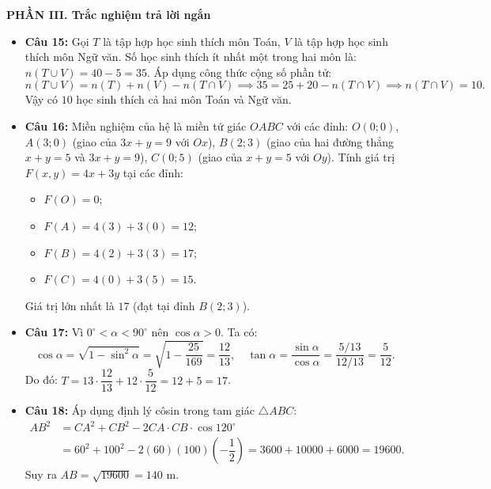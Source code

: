 \documentclass[12pt,a4paper]{article}
\begin{document}
\vspace{0.2cm}
\textbf{PHẦN III. Trắc nghiệm trả lời ngắn}
\begin{itemize}[leftmargin=0.6cm, itemsep=3pt]
    \item \textbf{Câu 15:} Gọi $T$ là tập hợp học sinh thích môn Toán, $V$ là tập hợp học sinh thích môn Ngữ văn.
    Số học sinh thích ít nhất một trong hai môn là: $n(T \cup V) = 40 - 5 = 35$.
    Áp dụng công thức cộng số phần tử:
    \[
    n(T \cup V) = n(T) + n(V) - n(T \cap V) \implies 35 = 25 + 20 - n(T \cap V) \implies n(T \cap V) = 10.
    \]
    Vậy có $10$ học sinh thích cả hai môn Toán và Ngữ văn.
    \item \textbf{Câu 16:} Miền nghiệm của hệ là miền tứ giác $OABC$ với các đỉnh:
    $O(0; 0)$, $A(3; 0)$ (giao của $3x + y = 9$ với $Ox$), $B(2; 3)$ (giao của hai đường thẳng $x + y = 5$ và $3x + y = 9$), $C(0; 5)$ (giao của $x + y = 5$ với $Oy$).
    Tính giá trị $F(x, y) = 4x + 3y$ tại các đỉnh:
    \begin{itemize}
        \item $F(O) = 0$;
        \item $F(A) = 4(3) + 3(0) = 12$;
        \item $F(B) = 4(2) + 3(3) = 17$;
        \item $F(C) = 4(0) + 3(5) = 15$.
    \end{itemize}
    Giá trị lớn nhất là $17$ (đạt tại đỉnh $B(2; 3)$).
    \item \textbf{Câu 17:} Vì $0^\circ < \alpha < 90^\circ$ nên $\cos \alpha > 0$. Ta có:
    \[
    \cos \alpha = \sqrt{1 - \sin^2 \alpha} = \sqrt{1 - \dfrac{25}{169}} = \dfrac{12}{13}, \quad \tan \alpha = \dfrac{\sin \alpha}{\cos \alpha} = \dfrac{5/13}{12/13} = \dfrac{5}{12}.
    \]
    Do đó: $T = 13 \cdot \dfrac{12}{13} + 12 \cdot \dfrac{5}{12} = 12 + 5 = 17$.
    \item \textbf{Câu 18:} Áp dụng định lý côsin trong tam giác $\triangle ABC$:
    \begin{align*}
    AB^2 &= CA^2 + CB^2 - 2 CA \cdot CB \cdot \cos 120^\circ \\
    &= 60^2 + 100^2 - 2(60)(100)\left(-\dfrac{1}{2}\right) = 3600 + 10000 + 6000 = 19600.
    \end{align*}
    Suy ra $AB = \sqrt{19600} = 140\text{ m}$.
\end{itemize}
\end{document}
